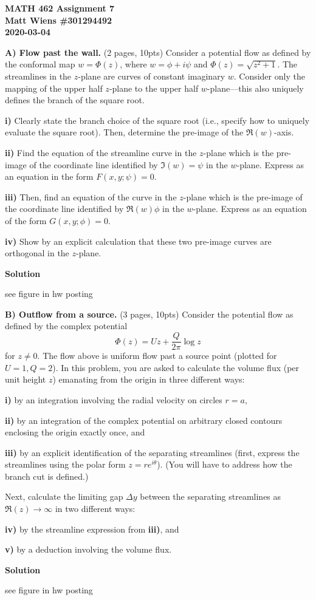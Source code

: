 \documentclass{article}
\begin{document}
\textbf{MATH 462 Assignment 7} \\
\textbf{Matt Wiens \#301294492} \\
\textbf{2020-03-04}

\textbf{A) Flow past the wall.} (2 pages, 10pts) Consider a potential
flow as defined by the conformal map $w = \Phi(z)$, where $w = \phi + i
\psi$ and $\Phi(z) = \sqrt{z^2 + 1}$. The streamlines in the $z$-plane
are curves of constant imaginary $w$. Consider only the mapping of the
upper half $z$-plane to the upper half $w$-plane---this also uniquely
defines the branch of the square root.

\textbf{i)} Clearly state the branch choice of the square root (i.e.,
specify how to uniquely evaluate the square root). Then, determine the
pre-image of the $\Re(w)$-axis.

\textbf{ii)} Find the equation of the streamline curve in the $z$-plane
which is the pre-image of the coordinate line identified by $\Im(w) =
\psi$ in the $w$-plane. Express as an equation in the form $F(x, y;
\psi) = 0$.

\textbf{iii)} Then, find an equation of the curve in the $z$-plane which
is the pre-image of the coordinate line identified by $\Re(w) \phi$ in
the $w$-plane. Express as an equation of the form $G(x, y; \phi) = 0$.

\textbf{iv)} Show by an explicit calculation that these two pre-image
curves are orthogonal in the $z$-plane.

\textbf{Solution}

see figure in hw posting

\newpage

\textbf{B) Outflow from a source.} (3 pages, 10pts) Consider the
potential flow as defined by the complex potential
%
\begin{equation*}
    \Phi(z) = U z + \frac{Q}{2 \pi} \log z
\end{equation*}
%
for $z \neq 0$. The flow above is uniform flow past a source point
(plotted for $U = 1, Q= 2$). In this problem, you are asked to calculate
the volume flux (per unit height $z$) emanating from the origin in three
different ways:

\textbf{i)} by an integration involving the radial velocity on circles
$r = a$,

\textbf{ii)} by an integration of the complex potential on arbitrary
closed contours enclosing the origin exactly once, and

\textbf{iii)} by an explicit identification of the separating
streamlines (first, express the streamlines using the polar form $z = r
e^{i \theta}$). (You will have to address how the branch cut is
defined.)

Next, calculate the limiting gap $\Delta y$ between the separating
streamlines as $\Re(z) \to \infty$ in two different ways:

\textbf{iv)} by the streamline expression from \textbf{iii)}, and

\textbf{v)} by a deduction involving the volume flux.

\textbf{Solution}

see figure in hw posting
\end{document}
